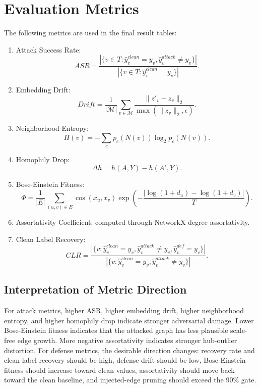 \documentclass[12pt,oneside]{report}
\begin{document}
\section{Evaluation Metrics}
The following metrics are used in the final result tables:
\begin{enumerate}
    \item Attack Success Rate:
    \begin{equation}
    ASR=\frac{|\{v\in T: \hat{y}^{clean}_v=y_v,\hat{y}^{attack}_v\neq y_v\}|}{|\{v\in T:\hat{y}^{clean}_v=y_v\}|}.
    \end{equation}
    \item Embedding Drift:
    \begin{equation}
    Drift=\frac{1}{|\mathcal{M}|}\sum_{v\in \mathcal{M}}\frac{\|z'_v-z_v\|_2}{\max(\|z_v\|_2,\epsilon)}.
    \end{equation}
    \item Neighborhood Entropy:
    \begin{equation}
    H(v)=-\sum_c p_c(N(v))\log_2 p_c(N(v)).
    \end{equation}
    \item Homophily Drop:
    \begin{equation}
    \Delta h=h(A,Y)-h(A',Y).
    \end{equation}
    \item Bose-Einstein Fitness:
    \begin{equation}
    \Phi=\frac{1}{|E|}\sum_{(u,v)\in E}\cos(x_u,x_v)\exp\left(-\frac{|\log(1+d_u)-\log(1+d_v)|}{T}\right).
    \end{equation}
    \item Assortativity Coefficient: computed through NetworkX degree assortativity.
    \item Clean Label Recovery:
    \begin{equation}
    CLR=\frac{|\{v:\hat{y}^{clean}_v=y_v,\hat{y}^{attack}_v\neq y_v,\hat{y}^{def}_v=y_v\}|}{|\{v:\hat{y}^{clean}_v=y_v,\hat{y}^{attack}_v\neq y_v\}|}.
    \end{equation}
\end{enumerate}

\subsection{Interpretation of Metric Direction}
For attack metrics, higher ASR, higher embedding drift, higher neighborhood entropy, and higher homophily drop indicate stronger adversarial damage. Lower Bose-Einstein fitness indicates that the attacked graph has less plausible scale-free edge growth. More negative assortativity indicates stronger hub-outlier distortion. For defense metrics, the desirable direction changes: recovery rate and clean-label recovery should be high, defense drift should be low, Bose-Einstein fitness should increase toward clean values, assortativity should move back toward the clean baseline, and injected-edge pruning should exceed the 90\% gate.
\end{document}
